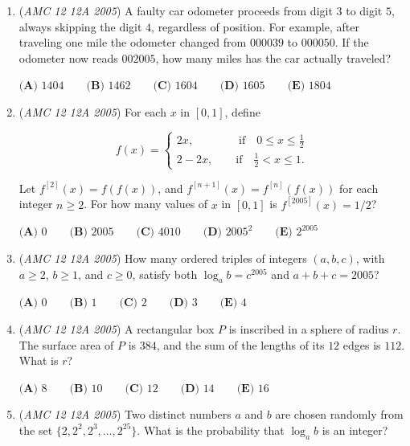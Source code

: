 \begin{enumerate}
 $\textbf{(A) } 100 \qquad \textbf{(B) } 102 \qquad \textbf{(C) } 104 \qquad \textbf{(D) } 106 \qquad \textbf{(E) } 108$


	\item (\textit{AMC 12 12A 2005}) A faulty car odometer proceeds from digit $3$ to digit $5$, always skipping the digit $4$, regardless of position. For example, after traveling one mile the odometer changed from $000039$ to $000050$. If the odometer now reads $002005$, how many miles has the car actually traveled?


 $\textbf{(A) } 1404 \qquad \textbf{(B) } 1462 \qquad \textbf{(C) } 1604 \qquad \textbf{(D) } 1605 \qquad \textbf{(E) } 1804$


	\item (\textit{AMC 12 12A 2005}) For each $x$ in $[0,1]$, define


 
 \[f(x) = \begin{cases}  2x, \qquad\qquad \mathrm{if} \quad 0 \leq x \leq \frac{1}{2}\\  2-2x, \qquad \mathrm{if} \quad \frac{1}{2} < x \leq 1.  \end{cases}\]


 Let $f^{[2]}(x) = f(f(x))$, and $f^{[n + 1]}(x) = f^{[n]}(f(x))$ for each integer $n \geq 2$. For how many values of $x$ in $[0,1]$ is $f^{[2005]}(x) = 1/2$?


 $\textbf{(A) } 0 \qquad \textbf{(B) } 2005 \qquad \textbf{(C) } 4010 \qquad \textbf{(D) } 2005^2 \qquad \textbf{(E) } 2^{2005}$


	\item (\textit{AMC 12 12A 2005}) How many ordered triples of integers $(a,b,c)$, with $a \geq 2$, $b \geq 1$, and $c \geq 0$, satisfy both $\log_{a}b = c^{2005}$ and $a + b + c = 2005$?


 $\textbf{(A) } 0 \qquad \textbf{(B) } 1 \qquad \textbf{(C) } 2 \qquad \textbf{(D) } 3 \qquad \textbf{(E) } 4$


	\item (\textit{AMC 12 12A 2005}) A rectangular box $P$ is inscribed in a sphere of radius $r$. The surface area of $P$ is $384$, and the sum of the lengths of its $12$ edges is $112$. What is $r$?


 $\textbf{(A) } 8 \qquad \textbf{(B) } 10 \qquad \textbf{(C) } 12 \qquad \textbf{(D) } 14 \qquad \textbf{(E) } 16$


	\item (\textit{AMC 12 12A 2005}) Two distinct numbers $a$ and $b$ are chosen randomly from the set $\{2, 2^2, 2^3, \ldots, 2^{25}\}$. What is the probability that $\log_{a}b$ is an integer?



\end{enumerate}
